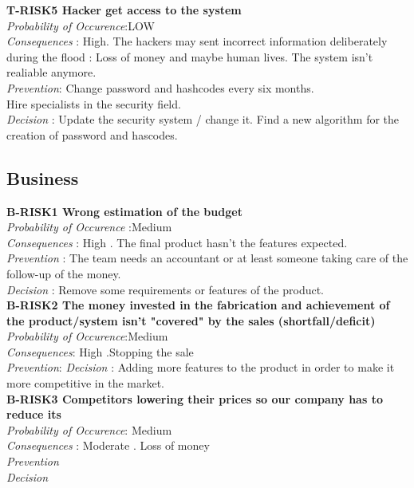 	\textbf{ T-RISK5 Hacker get access to the system} \\
	\textit{Probability of Occurence}:LOW \\
	\textit{Consequences} : High. The hackers may sent incorrect information deliberately during the flood : Loss of money and maybe human lives. The system isn't realiable anymore. \\
	\textit{Prevention}: Change password and hashcodes every six months. \\
	Hire specialists in the security field. \\
	\textit{Decision} : Update the security system / change it. Find a new algorithm for the creation of password and hascodes. \\


\subsection{Business}

	\textbf{ B-RISK1 Wrong estimation of the budget} \\
	\textit{Probability of Occurence} :Medium \\
	\textit{Consequences} : High . The final product hasn't the features expected. \\
	\textit{Prevention} : The team needs an accountant or at least someone taking care of the follow-up of the money. \\
	\textit{Decision} : Remove some requirements or features of the product. \\

	\textbf{ B-RISK2 The money invested in the fabrication and achievement of the product/system isn't "covered" by the sales (shortfall/deficit)} \\
	\textit{Probability of Occurence}:Medium \\
	\textit{Consequences}: High .Stopping the sale \\
	\textit{Prevention}: 
	\textit{Decision} : Adding more features to the product in order to make it more competitive in the market. \\
	

	\textbf{ B-RISK3 Competitors lowering their prices so our company has to reduce its} \\
	\textit{Probability of Occurence}: Medium \\
	\textit{Consequences} : Moderate . Loss of money \\
	\textit{Prevention} \\
	\textit{Decision} \\
	
